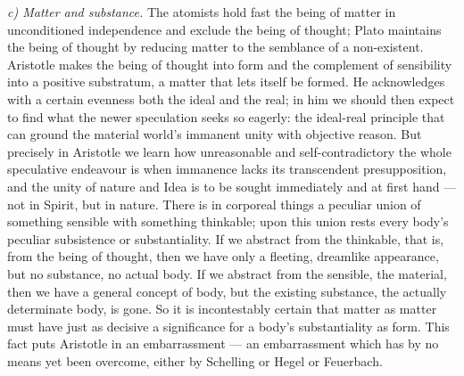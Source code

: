 \documentclass[12pt,a4paper]{book}
\newcommand{\runin}[1]{\emph{#1}\hspace{0.4em}}
\begin{document}
\runin{c) Matter and substance.} The atomists hold fast the being of matter in unconditioned independence and
exclude the being of thought; Plato maintains the being of thought by reducing matter to the semblance of a
non-existent. Aristotle makes the being of thought into form and the complement of sensibility into a positive
substratum, a matter that lets itself be formed. He acknowledges with a certain evenness both the ideal and the
real; in him we should then expect to find what the newer speculation seeks so eagerly: the ideal-real principle
that can ground the material world's immanent unity with objective reason.
But precisely in Aristotle we learn how unreasonable and self-contradictory the whole speculative endeavour is
when immanence lacks its transcendent presupposition, and the unity of nature and Idea is to be sought
immediately and at first hand --- not in Spirit, but in nature. There is in corporeal things a peculiar union
of something sensible with something thinkable; upon this union rests every body's peculiar subsistence or
substantiality. If we abstract from the thinkable, that is, from the being of thought, then we have only a
fleeting, dreamlike appearance, but no substance, no actual body. If we abstract from the sensible, the
material, then we have a general concept of body, but the existing substance, the actually determinate body, is
gone. So it is incontestably certain that matter as matter must have just as decisive a significance for a
body's substantiality as form. This fact puts Aristotle in an embarrassment --- an embarrassment which has by no
means yet been overcome, either by Schelling or Hegel or Feuerbach.
\end{document}
